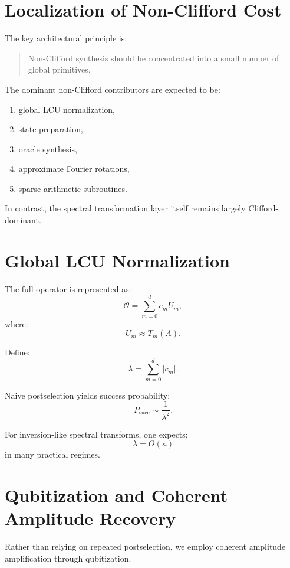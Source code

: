 \documentclass[12pt,a4paper]{article}
\begin{document}
\section{Localization of Non-Clifford Cost}

The key architectural principle is:

\begin{quote}
Non-Clifford synthesis should be concentrated into a small number of global primitives.
\end{quote}

The dominant non-Clifford contributors are expected to be:

\begin{enumerate}
    \item global LCU normalization,
    \item state preparation,
    \item oracle synthesis,
    \item approximate Fourier rotations,
    \item sparse arithmetic subroutines.
\end{enumerate}

In contrast, the spectral transformation layer itself remains largely Clifford-dominant.


\section{Global LCU Normalization}

The full operator is represented as:
\[
\mathcal O
=
\sum_{m=0}^{d}
c_m U_m,
\]
where:
\[
U_m
\approx
T_m(A).
\]

Define:
\[
\lambda
=
\sum_{m=0}^{d}
|c_m|.
\]

Naive postselection yields success probability:
\[
P_{\mathrm{succ}}
\sim
\frac{1}{\lambda^2}.
\]

For inversion-like spectral transforms, one expects:
\[
\lambda
=
O(\kappa)
\]
in many practical regimes.


\section{Qubitization and Coherent Amplitude Recovery}

Rather than relying on repeated postselection, we employ coherent amplitude amplification through qubitization.
\end{document}
